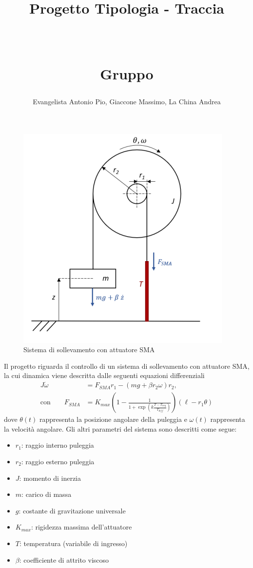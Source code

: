 \documentclass[a4paper, 11pt]{article}
\title{ \vspace{-1in}
		\huge \strut \coursename \strut 
		\\
		\Large  \strut Progetto Tipologia \tipology - Traccia \trace 
		\\
		\Large  \strut \projectname\strut
		\\
		\Large  \strut Gruppo \group\strut
		\vspace{-0.4cm}
}
\author{Evangelista Antonio Pio, Giaccone Massimo, La China Andrea}
\date{}
\begin{document}
\maketitle
\vspace{-0.5cm}

\begin{figure} [htp]
    \centering
    \includegraphics[scale = 0.6]{Immagini/progetto.png}
    \caption{Sistema di sollevamento con attuatore SMA}
    \label{fig:enter-label}
\end{figure}

Il progetto riguarda il controllo di un sistema di sollevamento con attuatore SMA, la cui dinamica viene descritta dalle seguenti equazioni differenziali 
%
\begin{subequations}\label{eq:system}

\begin{align}
	J\dot{\omega}& = F_{SMA} r_1 - (mg + \beta r_2\omega)r_2, 
	\\
	\mbox{con} \qquad F_{SMA}& = K_{max} \left(1-\frac{1}{1+\exp(k\frac{T-T_{avg}}{T_{diff}})}\right)(\ell - r_1 \theta)
\end{align}
\end{subequations}
%
dove $\theta(t)$ rappresenta la posizione angolare della puleggia e $\omega(t)$ rappresenta la velocità angolare. Gli altri parametri del sistema sono descritti come segue:

\begin{itemize}
    \item $r_1$: raggio interno puleggia
    \item $r_2$: raggio esterno puleggia
    \item $J$: momento di inerzia
    \item $m$: carico di massa
    \item $g$: costante di gravitazione universale
    \item $K_{max}$: rigidezza massima dell'attuatore
    \item $T$: temperatura (variabile di ingresso)
    \item $\beta$: coefficiente di attrito viscoso
\end{itemize}
\end{document}
